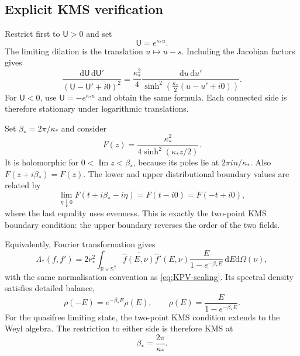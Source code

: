 \documentclass[11pt,a4paper]{article}
\theoremstyle{definition}
\theoremstyle{remark}
\newcommand{\dd}{\mathrm d}
\begin{document}
	\subsection{Explicit KMS verification}
	
	Restrict first to $\mathsf U>0$ and set
	\begin{equation}
		\mathsf U=e^{\kappa_*u}.
		\label{eq:logarithmic-coordinate}
	\end{equation}
	The limiting dilation is the translation $u\mapsto u-s$.  Including the
	Jacobian factors gives
	\begin{equation}
		\frac{\dd\mathsf U\,\dd\mathsf U'}
		{(\mathsf U-\mathsf U'+i0)^2}
		=\frac{\kappa_*^2}{4}
		\frac{\dd u\,\dd u'}
		{\sinh^2\!\left(\frac{\kappa_*}{2}(u-u'+i0)\right)}.
		\label{eq:KPV-sinh-kernel}
	\end{equation}
	For $\mathsf U<0$, use $\mathsf U=-e^{\kappa_*u}$ and obtain the same
	formula.  Each connected side is therefore stationary under logarithmic
	translations.
	
	Set $\beta_*=2\pi/\kappa_*$ and consider
	\begin{equation}
		F(z)=\frac{\kappa_*^2}{4\sinh^2(\kappa_*z/2)}.
	\end{equation}
	It is holomorphic for $0<\operatorname{Im}z<\beta_*$, because its poles lie
	at $2\pi i n/\kappa_*$.  Also $F(z+i\beta_*)=F(z)$.  The lower and upper
	distributional boundary values are related by
	\begin{equation}
		\lim_{\eta\downarrow0}F(t+i\beta_*-i\eta)
		=F(t-i0)=F(-t+i0),
		\label{eq:KMS-boundaries}
	\end{equation}
	where the last equality uses evenness.  This is exactly the two-point KMS
	boundary condition: the upper boundary reverses the order of the two fields.
	
	Equivalently, Fourier transformation gives
	\begin{equation}
		\Lambda_*(f,f')
		=2r_*^2\int_{\mathbb R\times\mathbb S^2}
		\overline{\widehat f(E,\nu)}\widehat f'(E,\nu)
		\frac{E}{1-e^{-\beta_*E}}\,\dd E\dd\Omega(\nu),
		\label{eq:KMS-Fourier}
	\end{equation}
	with the same normalisation convention as \eqref{eq:KPV-scaling}.  Its
	spectral density satisfies detailed balance,
	\begin{equation}
		\rho(-E)=e^{-\beta_*E}\rho(E),
		\qquad \rho(E)=\frac{E}{1-e^{-\beta_*E}}.
	\end{equation}
	For the quasifree limiting state, the two-point KMS condition extends to the
	Weyl algebra.  The restriction to either side is therefore KMS at
	\begin{equation}
		\beta_*=\frac{2\pi}{\kappa_*}.
		\label{eq:local-temperature}
	\end{equation}
	
\end{document}
